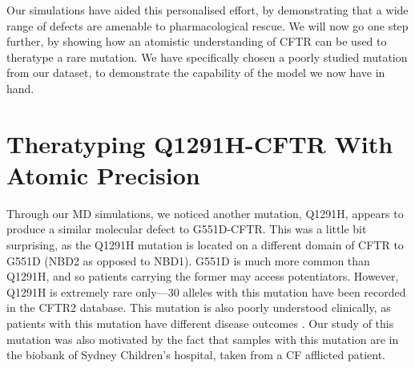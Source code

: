 Our simulations have aided this personalised effort, by demonstrating that a wide range of defects are amenable to pharmacological rescue. We will now go one step further, by showing how an atomistic understanding of CFTR can be used to theratype a rare mutation. We have specifically chosen a poorly studied mutation from our dataset, to demonstrate the capability of the model we now have in hand. 

\section{Theratyping Q1291H-CFTR With Atomic Precision}

Through our MD simulations, we noticed another mutation, Q1291H, appears to produce a similar molecular defect to G551D-CFTR. This was a little bit surprising, as the Q1291H mutation is located on a different domain of CFTR to G551D (NBD2 as opposed to NBD1). G551D is much more common than Q1291H, and so patients carrying the former may access potentiators. However, Q1291H is extremely rare only---30 alleles with this mutation have been recorded in the CFTR2 database. This mutation is also poorly understood clinically, as patients with this mutation have different disease outcomes \cite{cftr2}. Our study of this mutation was also motivated by the fact that samples with this mutation are in the biobank of Sydney Children's hospital, taken from a CF afflicted patient. 


